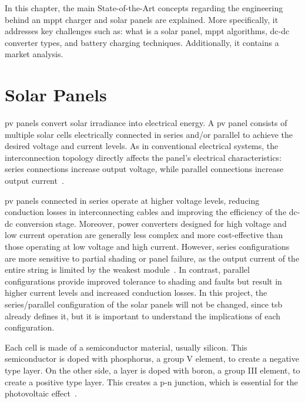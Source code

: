 \label{sec:introduction:background}

In this chapter, the main State-of-the-Art concepts regarding the engineering behind an \acs{mppt} charger and solar panels are explained. More specifically, it addresses key challenges such as: what is a solar panel, \acs{mppt} algorithms, \acs{dc}-\acs{dc} converter types, and battery charging techniques. Additionally, it contains a market analysis.  


\section{Solar Panels}

    \ac{pv} panels convert solar irradiance into electrical energy. A \acs{pv} panel consists of multiple solar cells electrically connected in series and/or parallel to achieve the desired voltage and current levels. As in conventional electrical systems, the interconnection topology directly affects the panel's electrical characteristics: series connections increase output voltage, while parallel connections increase output current~\cite{bendib_survey_mppt_methods}.

    \acs{pv} panels connected in series operate at higher voltage levels, reducing conduction losses in interconnecting cables and improving the efficiency of the \acs{dc}-\acs{dc} conversion stage. 
    Moreover, power converters designed for high voltage and low current operation are generally less complex and more cost-effective than those operating at low voltage and high current. 
    However, series configurations are more sensitive to partial shading or panel failure, as the output current of the entire string is limited by the weakest module~\cite{Shading_Effect_PV_Modules_2011}. 
    In contrast, parallel configurations provide improved tolerance to shading and faults but result in higher current levels and increased conduction losses.
    In this project, the series/parallel configuration of the solar panels will not be changed, since \ac{tsb} already defines it, but it is important to understand the implications of each configuration. 

    Each cell is made of a semiconductor material, usually silicon. This semiconductor is doped with phosphorus, a group V element, to create a negative type layer. On the other side, a layer is doped with boron, a group III element, to create a positive type layer. This creates a p-n junction, which is essential for the photovoltaic effect~\cite{photovoltaics_System_Design}.

